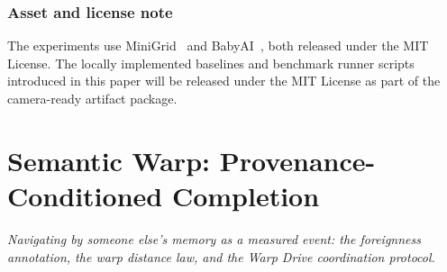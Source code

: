 \documentclass{article}
\begin{document}
\section{Asset and license note}
\label{p1:app:assets}

The experiments use MiniGrid~\citep{MinigridMiniworld23} and BabyAI~\citep{chevalier2018babyai}, both released under the MIT License. The locally implemented baselines and benchmark runner scripts introduced in this paper will be released under the MIT License as part of the camera-ready artifact package.

\clearpage
\FloatBarrier
\FloatBarrier

\clearpage
\part{Semantic Warp: Provenance-Conditioned Completion}
\noindent\textit{Navigating by someone else's memory as a measured event: the foreignness annotation, the warp distance law, and the Warp Drive coordination protocol.}
\end{document}
